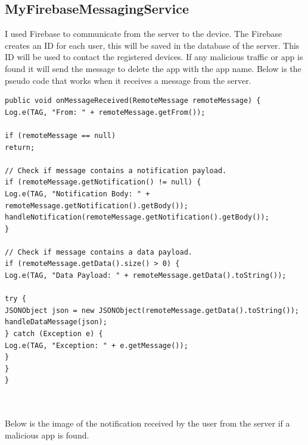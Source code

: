 \subsection{MyFirebaseMessagingService}

\par I used Firebase to communicate from the server to the device.
The Firebase creates an ID for each user, this will be saved in the database of the server.
This ID will be used to contact the registered devices.
If any malicious traffic or app is found it will send the message to delete the app with the app name.
Below is the pseudo code that works when it receives a message from the server.

\begin{lstlisting}
public void onMessageReceived(RemoteMessage remoteMessage) {
Log.e(TAG, "From: " + remoteMessage.getFrom());

if (remoteMessage == null)
return;

// Check if message contains a notification payload.
if (remoteMessage.getNotification() != null) {
Log.e(TAG, "Notification Body: " + remoteMessage.getNotification().getBody());
handleNotification(remoteMessage.getNotification().getBody());
}

// Check if message contains a data payload.
if (remoteMessage.getData().size() > 0) {
Log.e(TAG, "Data Payload: " + remoteMessage.getData().toString());

try {
JSONObject json = new JSONObject(remoteMessage.getData().toString());
handleDataMessage(json);
} catch (Exception e) {
Log.e(TAG, "Exception: " + e.getMessage());
}
}
}
\end{lstlisting}
\\
\\

Below is the image of the notification received by the user from the server if a malicious app is found. 

